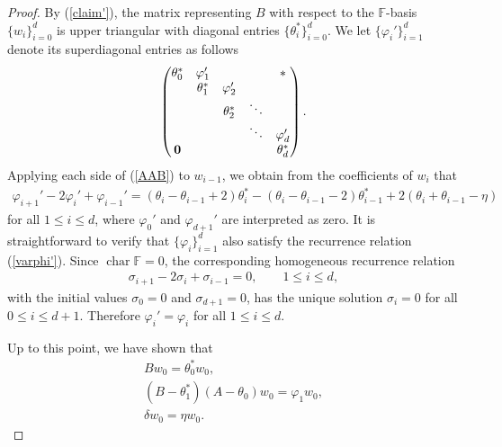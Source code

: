 \documentclass[11pt]{article}
\numberwithin{equation}{section}
\def\F{\mathbb F}
\numberwithin{equation}{section}
\begin{document}
\begin{proof}
By (\ref{claim'}), the matrix representing $B$ with respect to the $\F$-basis $\{w_i\}_{i=0}^d$ is upper triangular with diagonal entries $\{\theta_i^*\}_{i=0}^d$. We let $\{\varphi_i'\}_{i=1}^d$ denote its superdiagonal entries as follows
\begin{gather}\label{B}
\begin{pmatrix}
\theta_0^* &\varphi_1' & & &{\bf *}
\\
 &\theta_1^* &\varphi_2'
\\
 & &\theta_2^* &\ddots
 \\
 & & &\ddots &\varphi_d'
 \\
{\bf 0} & & & &\theta_d^*
\end{pmatrix}.
\end{gather}
Applying each side of (\ref{AAB}) to $w_{i-1}$, we obtain from the coefficients of $w_i$ that
\begin{gather}\label{varphi'}
\varphi_{i+1}'-2\varphi_i'+\varphi_{i-1}'
=(\theta_i-\theta_{i-1}+2)\theta_i^*
-(\theta_i-\theta_{i-1}-2)\theta_{i-1}^*
+2(\theta_i+\theta_{i-1}-\eta)
\end{gather}
for all $1\leq i\leq d$, where $\varphi_0'$ and $\varphi_{d+1}'$ are interpreted as zero.
It is straightforward to verify that $\{\varphi_i\}_{i=1}^d$ also satisfy the recurrence relation (\ref{varphi'}). Since $\operatorname{char}\F=0$, the corresponding homogeneous recurrence relation
\begin{gather*}
\sigma_{i+1}-2\sigma_i+\sigma_{i-1}=0, \qquad 1\leq i\leq d,
\end{gather*}
with the initial values $\sigma_0=0$ and $\sigma_{d+1}=0$, has the unique solution $\sigma_i=0$ for all $0\leq i\leq d+1$. Therefore $\varphi_i'=\varphi_i$ for all $1\leq i\leq d$.

Up to this point, we have shown that
\begin{gather}
Bw_0=\theta_0^* w_0,\label{even:U1}\\
(B-\theta_1^*)(A-\theta_0)w_0=\varphi_1 w_0,\label{even:U2}\\
\delta w_0=\eta w_0.\label{even:U3}
\end{gather}


\end{proof}
\end{document}
